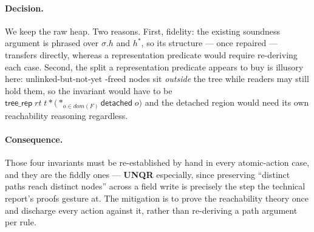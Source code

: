 \paragraph{Decision.}  We keep the raw heap.  Two reasons.  First, fidelity: the
existing soundness argument is phrased over $\sigma.h$ and $h^{*}$, so its
structure --- once repaired --- transfers directly, whereas a representation
predicate would require re-deriving each case.  Second, the split a
representation predicate appears to buy is illusory here: unlinked-but-not-yet
-freed nodes sit \emph{outside} the tree while readers may still hold them, so
the invariant would have to be
$\textsf{tree\_rep}\;rt\;t \ast \big(\ast_{o \in dom(F)} \textsf{detached}\;o\big)$
and the detached region would need its own reachability reasoning regardless.

\paragraph{Consequence.}  Those four invariants must be re-established by hand
in every atomic-action case, and they are the fiddly ones --- \textbf{UNQR}
especially, since preserving ``distinct paths reach distinct nodes'' across a
field write is precisely the step the technical report's proofs gesture at.  The
mitigation is to prove the reachability theory once and discharge every action
against it, rather than re-deriving a path argument per rule.

